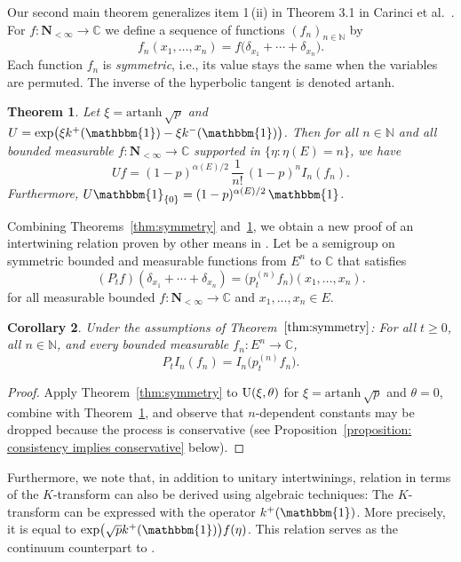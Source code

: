 \documentclass[pdftex]{sigma}
\numberwithin{equation}{section}
\newtheorem{Theorem}{Theorem}[section]
\newtheorem{Corollary}[Theorem]{Corollary}
\newcommand{\N}{\mathbb{N}}
\newcommand{\C}{\mathbb{C}}
\newcommand{\one}{\mathbbm{1}}
\newcommand{\1}{\mathbbm{1}}
\begin{document}
Our second main theorem generalizes item 1\,(ii) in Theorem 3.1 in Carinci et al.~\cite{carinci2019orthogonal}.
For $f\colon \mathbf N_{<\infty}\to \C$ we define a sequence of functions $(f_n)_{n\in \N}$ by
\[
	 f_n(x_1,\ldots, x_n) = f(\delta_{x_1}+\cdots + \delta_{x_n} \bigr).
\]
Each function $f_n$ is \emph{symmetric}, i.e., its value stays the same when the variables are permuted. The inverse of the hyperbolic tangent is denoted $\mathrm{artanh}$.

\begin{Theorem} \label{thm:unitary-meixner}
	Let $\xi= \mathrm{artanh}\, \sqrt p$ and $U= \exp\bigl(\xi k^+(\1) - \xi k^-(\1)\bigr)$. Then for all $n\in \N$ and all bounded measurable $f\colon \mathbf N_{<\infty}\to \C$ supported in
$\{\eta\colon \eta(E)=n\}$, we have
	\[
		 U f = (1-p)^{\alpha(E)/2} \, \frac{1}{n!}\, (1-p)^n I_n(f_n).
	\]
	Furthermore, $ U \1_{\{0\}} = (1-p)^{\alpha(E)/2} \, \1$.
\end{Theorem}

Combining Theorems~\ref{thm:symmetry} and~\ref{thm:unitary-meixner}, we obtain a new proof of an intertwining relation proven by other means in \cite[Theorems~3.15 and~5.2]{IntertwiningConsistent}. Let  be a semigroup on symmetric bounded and measurable functions from $E^n$ to $\C$ that satisfies
\[
	(P_t f)(\delta_{x_1}+\cdots + \delta_{x_n}) = \bigl(p_t^{(n)} f_n\bigr)(x_1,\ldots,x_n).
\]
for all measurable bounded $f \colon \mathbf{N}_{<\infty} \to \C$ and $x_1, \ldots, x_n \in E$.
\begin{Corollary} \label{cor:meixner-intertwining}
	Under the assumptions of Theorem~$\ref{thm:symmetry}$: For all $t\geq 0$, all $n\in \N$, and every bounded measurable $f_n\colon E^n\to \C$,
	\[
		P_t I_n(f_n) = I_n\bigl(p_t^{(n)} f_n\bigr).
	\]
\end{Corollary}

\begin{proof}
	Apply Theorem~\ref{thm:symmetry} to ${\rm U}(\xi,\theta)$ for $\xi =\mathrm{artanh}\, \sqrt p$ and $\theta =0$, combine with Theorem~\ref{thm:unitary-meixner}, and observe that $n$-dependent constants may be dropped because the process is conservative (see Proposition~\ref{proposition: consistency implies conservative} below).
\end{proof}

Furthermore, we note that, in addition to unitary intertwinings, relation \cite[equa\-tion~(3.6)]{IntertwiningConsistent} in terms of the $K$-transform can also be derived using algebraic techniques: The $K$-transform can be expressed with the operator $k^+(\one)$. More precisely, it is equal to $\exp \bigl(\sqrt{p} k^+(\one) \bigr) f(\eta)$. This relation serves as the continuum counterpart to \cite[Lemma~4.2]{carinci2021consistent}.
\end{document}
